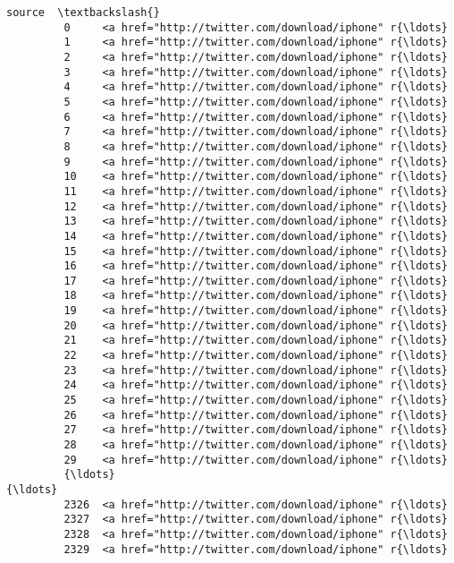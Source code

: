 \documentclass[11pt]{article}
\begin{document}
\begin{Verbatim}[commandchars=\\\{\}]
                                                          source  \textbackslash{}
         0     <a href="http://twitter.com/download/iphone" r{\ldots}   
         1     <a href="http://twitter.com/download/iphone" r{\ldots}   
         2     <a href="http://twitter.com/download/iphone" r{\ldots}   
         3     <a href="http://twitter.com/download/iphone" r{\ldots}   
         4     <a href="http://twitter.com/download/iphone" r{\ldots}   
         5     <a href="http://twitter.com/download/iphone" r{\ldots}   
         6     <a href="http://twitter.com/download/iphone" r{\ldots}   
         7     <a href="http://twitter.com/download/iphone" r{\ldots}   
         8     <a href="http://twitter.com/download/iphone" r{\ldots}   
         9     <a href="http://twitter.com/download/iphone" r{\ldots}   
         10    <a href="http://twitter.com/download/iphone" r{\ldots}   
         11    <a href="http://twitter.com/download/iphone" r{\ldots}   
         12    <a href="http://twitter.com/download/iphone" r{\ldots}   
         13    <a href="http://twitter.com/download/iphone" r{\ldots}   
         14    <a href="http://twitter.com/download/iphone" r{\ldots}   
         15    <a href="http://twitter.com/download/iphone" r{\ldots}   
         16    <a href="http://twitter.com/download/iphone" r{\ldots}   
         17    <a href="http://twitter.com/download/iphone" r{\ldots}   
         18    <a href="http://twitter.com/download/iphone" r{\ldots}   
         19    <a href="http://twitter.com/download/iphone" r{\ldots}   
         20    <a href="http://twitter.com/download/iphone" r{\ldots}   
         21    <a href="http://twitter.com/download/iphone" r{\ldots}   
         22    <a href="http://twitter.com/download/iphone" r{\ldots}   
         23    <a href="http://twitter.com/download/iphone" r{\ldots}   
         24    <a href="http://twitter.com/download/iphone" r{\ldots}   
         25    <a href="http://twitter.com/download/iphone" r{\ldots}   
         26    <a href="http://twitter.com/download/iphone" r{\ldots}   
         27    <a href="http://twitter.com/download/iphone" r{\ldots}   
         28    <a href="http://twitter.com/download/iphone" r{\ldots}   
         29    <a href="http://twitter.com/download/iphone" r{\ldots}   
         {\ldots}                                                 {\ldots}   
         2326  <a href="http://twitter.com/download/iphone" r{\ldots}   
         2327  <a href="http://twitter.com/download/iphone" r{\ldots}   
         2328  <a href="http://twitter.com/download/iphone" r{\ldots}   
         2329  <a href="http://twitter.com/download/iphone" r{\ldots}   

\end{Verbatim}
\end{document}

